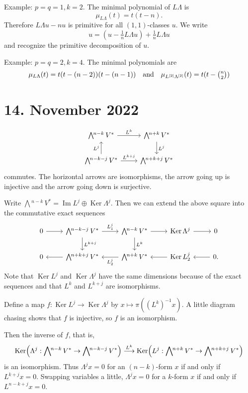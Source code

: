 \documentclass[11pt]{article}
\theoremstyle{definition}
\def\^#1{^{[#1]}}
\def\qandq{\quad\text{and}\quad}
\DeclareMathOperator{\im}{Im}
\DeclareMathOperator{\Ker}{Ker}
\newcommand{\ext}[1]{\bigwedge{}^{\!\!#1}\,}
\begin{document}
Example: $p = q = 1, k = 2$.
The minimal polynomial of $L\Lambda$ is
$$
\mu_{L\Lambda}(t) = t(t - n).
$$
Therefore $L\Lambda u - n u$ is primitive for all $(1,1)$-classes $u$.
We write
$$
u = (u - \tfrac 1n L\Lambda u) + \tfrac 1n L \Lambda u
$$
and recognize the primitive decomposition of $u$.

Example: $p = q = 2, k = 4$.
The minimal polynomials are
$$
\mu_{L\Lambda}(t) = t(t - (n-2))(t - (n-1))
\qandq
\mu_{L\^2\Lambda\^2}(t) = t(t - \tbinom{n}{2})
$$

\section{14. November 2022}

$$
\begin{tikzcd}
\ext{n-k} V^* \ar[r,"L^k"]  &
\ext{n+k} V^* \ar[d,"L^j"]
\\
\ext{n-k-j} V^* \ar[r,"L^{k+j}"] \ar[u,"L^j"] &
\ext{n+k+j} V^*
\end{tikzcd}
$$
commutes.
The horizontal arrows are isomorphisms, the arrow going up is injective and the
arrow going down is surjective.

Write $\ext{n-k} V^* = \im L^j \oplus \Ker \Lambda^j$.
Then we can extend the above square into the commutative exact sequences
$$
\begin{tikzcd}
0 \ar[r] &
\ext{n-k-j} V^* \ar[r,"L^j_1"] \ar[d,"L^{k+j}"] &
\ext{n-k} V^* \ar[r] \ar[d,"L^{k}"] &
\Ker \Lambda^j  \ar[r]  &
0
\\
0 &
\ext{n+k+j} V^* \ar[l] &
\ext{n+k} V^* \ar[l,"L^j_2"] &
\Ker L^j_2 \ar[l] &
0.\ar[l]
\end{tikzcd}
$$
Note that $\Ker L^j$ and $\Ker \Lambda^j$ have the same dimensions because of
the exact sequences and that $L^k$ and $L^{k+j}$ are isomorphisms.

Define a map $f : \Ker L^j \to \Ker \Lambda^j$ by $x \mapsto \pi((L^k)^{-1} x)$.
A little diagram chasing shows that $f$ is injective, so $f$ is an isomorphism.

Then the inverse of $f$, that is,
$$
\Ker \Bigl( \Lambda^j : \ext{n-k} V^* \to \ext{n-k-j} V^*\Bigr)
\stackrel{L^k}{\longrightarrow}
\Ker\Bigl( L^j : \ext{n+k}V^* \to \ext{n+k+j}V^*\Bigr)
$$
is an isomorphism.
Thus $\Lambda^j x = 0$ for an $(n-k)$-form $x$ if and only if
$L^{k+j} x = 0$.
Swapping variables a little, $\Lambda^j x = 0$ for a $k$-form $x$ if and only
if $L^{n-k+j} x = 0$.
\end{document}
